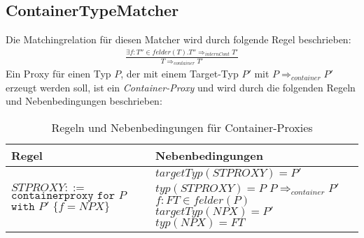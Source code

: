 \documentclass[a4paper,12pt]{article}
\begin{document}
\subsection{ContainerTypeMatcher}
Die Matchingrelation für diesen Matcher wird durch folgende Regel beschrieben:
\begin{gather*}
\frac{\exists f:T''\in felder(T). T'' \Rightarrow_{internCont} T'}{T \Rightarrow_{container} T'}
\end{gather*}
Ein Proxy für einen Typ $P$, der mit einem Target-Typ $P'$ mit $P \Rightarrow_{container} P'$ erzeugt werden soll, ist ein \emph{Container-Proxy} und wird durch die folgenden Regeln und Nebenbedingungen beschrieben:
\begin{table}[H]
\centering
\begin{tabular}{|p{6cm}|p{8cm}|}
\hline
\hline
\centering\textbf{Regel} & \textbf{Nebenbedingungen} \\
\hline
\hline
$\mathit{STPROXY} ::=$\newline $\texttt{containerproxy} \texttt{ for } P$\newline
$ \texttt{with } P' \texttt{ \{} f = \mathit{NPX} \texttt{\}}$ & 
$\mathit{targetTyp(STPROXY)} = P'$\newline
$\mathit{typ(STPROXY)} = P$\newline
$P \Rightarrow_{container} P'$\newline
$\mathit{f:FT} \in \mathit{felder(P)}$\newline
$\mathit{targetTyp(NPX)} = P'$\newline
$\mathit{typ(NPX)} = FT$\\
\hline
\hline
\end{tabular}
\caption{Regeln und Nebenbedingungen für Container-Proxies}
 \label{tab:containerAttr}
\end{table}
\end{document}
